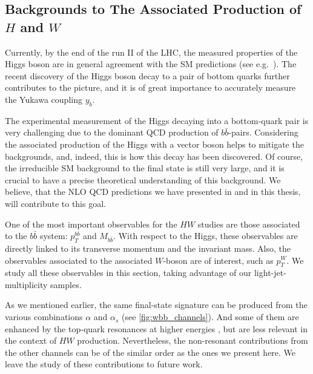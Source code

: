 

\subsection{Backgrounds to The Associated Production of $H$ and $W$}
\label{sec:hw}

Currently, by the end of the run II of the LHC,
the measured properties of the Higgs boson are
in general agreement with the SM predictions (see e.g.\ \cite{Khachatryan:2016vau}).
The recent discovery of the Higgs boson decay to a pair of bottom quarks \cite{Sirunyan:2018kst,Aaboud:2018zhk}
further contributes to the picture, 
and it is of great importance to accurately measure the Yukawa coupling $y_b$.

The experimental measurement of the Higgs decaying into a bottom-quark pair
is very challenging due to the dominant QCD production of $b\bar{b}$-pairs.
Considering the associated production of the Higgs with a vector boson 
helps to mitigate the backgrounds, and, indeed, this is how this decay has been discovered.
Of course, the irreducible SM background to the \Wbb{} final state is still very large,
and it is crucial to have a precise theoretical understanding of this background. 
We believe, that the NLO QCD predictions we have presented in \cite{Anger:2017glm} and
in this thesis, will contribute to this goal.

One of the most important observables for the $HW$ studies are those associated to the $b\bar
b$ system: $p_T^{b\bar b}$ and $M_{b\bar b}$.
With respect to the Higgs, these observables are directly linked to its transverse momentum and the invariant mass. 
Also, the observables associated to the associated $W$-boson are of interest, such as $p_T^W$.
We study all these observables in this section, taking advantage of our light-jet-multiplicity samples.

As we mentioned earlier, the same final-state signature can
be produced from the various combinations $\alpha$ and $\alpha_s$ (see \cref{fig:wbb_channels}). 
And some of them are enhanced by the top-quark resonances at higher energies \cite{Denner:2017kzu},
but are less relevant in the context of $HW$ production.
Nevertheless, the non-resonant contributions from the other channels can be of the similar order
as the ones we present here. We leave the study of these contributions to future work.

